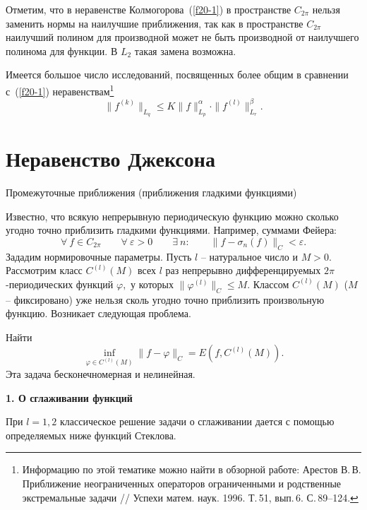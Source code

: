  Отметим, что в неравенстве Колмогорова~(\ref{f20-1}) в пространстве $C_{2\pi}$
 нельзя заменить нормы на наилучшие приближения, так как в
 пространстве $C_{2\pi}$ наилучший полином для производной может не быть
 производной от наилучшего полинома для функции. В $L_2$ такая замена возможна.

Имеется большое число исследований, посвященных более общим
 в сравнении с~(\ref{f20-1}) неравенствам\footnote{Информацию по
 этой тематике можно найти в обзорной работе:
Арестов В.\,В. Приближение неограниченных операторов ограниченными и
родственные экстремальные задачи
 // Успехи матем. наук. 1996. Т.\,51, вып.\,6. С.\,89--124.}
 $$
 \|f^{(k)}\|_{L_q}\le K\|f\|_{L_p}^{\alpha}\cdot
 \|f^{(l)}\|_{L_r}^{\beta}.
 $$


 \section{Неравенство Джексона}

 {Промежуточные приближения (приближения гладкими
 функциями)}
 \vspace{3mm}

 Известно, что всякую непрерывную периодическую  функцию можно сколько угодно
 точно приблизить гладкими функциями. Например, суммами
 Фейера:
 $$
 \forall\ f\in C_{{2\pi}}\qquad \forall\ \varepsilon>0\qquad \exists\ n:\qquad
 \|f-\sigma_n{(f)}\|_C<\varepsilon.
 $$
 Зададим нормировочные параметры. Пусть $l$
 -- натуральное число и $M>0.$ Рассмотрим класс $C^{(l)}(M)$ всех
 $l$ раз непрерывно дифференцируемых $2\pi$-периодических
 функций $\varphi,$ у которых  $\|\varphi^{(l)}\|_C\le M.$
 Классом $C^{(l)}(M)$ ($M$ -- фиксировано) уже нельзя  сколь угодно точно
 приблизить произвольную
 функцию. Возникает следующая проблема.

 \task %
 Найти
 $$
 \inf_{\varphi\in C^{(l)}(M)} \|f-\varphi\|_C=E(f,C^{(l)}(M)).
 $$
 Эта задача бесконечномерная и нелинейная.

\vspace{3mm}
 {\bf 1. О сглаживании функций}
 \vspace{3mm}

 При $l=1,2$ классическое решение задачи о сглаживании дается
 с помощью определяемых ниже функций Стеклова.

